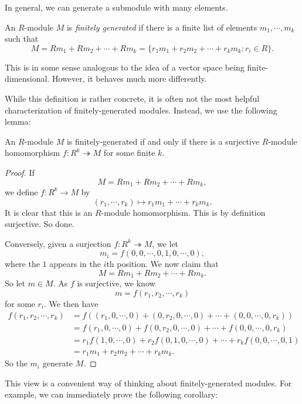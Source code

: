 \documentclass[a4paper]{article}
\begin{document}
In general, we can generate a submodule with many elements.
\begin{defi}
  An $R$-module $M$ is \emph{finitely generated} if there is a finite list of elements $m_1, \cdots, m_k$ such that
  \[
    M = Rm_1 + Rm_2 + \cdots + Rm_k = \{r_1 m_1 + r_2 m_2 + \cdots + r_k m_k: r_i \in R\}.
  \]
\end{defi}
This is in some sense analogous to the idea of a vector space being finite-dimensional. However, it behaves much more differently.

While this definition is rather concrete, it is often not the most helpful characterization of finitely-generated modules. Instead, we use the following lemma:
\begin{lemma}
  An $R$-module $M$ is finitely-generated if and only if there is a surjective $R$-module homomorphism $f: R^k \twoheadrightarrow M$ for some finite $k$.
\end{lemma}

\begin{proof}
  If
  \[
    M = R m_1 + R m_2 + \cdots + R m_k,
  \]
  we define $f: R^k \to M$ by
  \[
    (r_1, \cdots, r_k) \mapsto r_1 m_1 + \cdots + r_k m_k.
  \]
  It is clear that this is an $R$-module homomorphism. This is by definition surjective. So done.

  Conversely, given a surjection $f: R^k \twoheadrightarrow M$, we let
  \[
    m_i = f(0, 0, \cdots, 0, 1, 0, \cdots, 0),
  \]
  where the $1$ appears in the $i$th position. We now claim that
  \[
    M = R m_1 + R m_2 + \cdots + R m_k.
  \]
  So let $m \in M$. As $f$ is surjective, we know
  \[
    m = f(r_1, r_2, \cdots, r_k)
  \]
  for some $r_i$. We then have
  \begin{align*}
    f(r_1, r_2, \cdots, r_k) &= f((r_1, 0, \cdots, 0) + (0, r_2, 0, \cdots, 0) + \cdots + (0, 0, \cdots, 0, r_k))\\
    &= f(r_1, 0, \cdots, 0) + f(0, r_2, 0, \cdots, 0) + \cdots + f(0, 0, \cdots, 0, r_k)\\
    &= r_1 f(1, 0, \cdots, 0) + r_2 f(0, 1, 0, \cdots, 0) + \cdots + r_k f(0, 0, \cdots, 0, 1)\\
    &= r_1 m_1 + r_2 m_2 + \cdots + r_k m_k.
  \end{align*}
  So the $m_i$ generate $M$.
\end{proof}
This view is a convenient way of thinking about finitely-generated modules. For example, we can immediately prove the following corollary:
\end{document}
